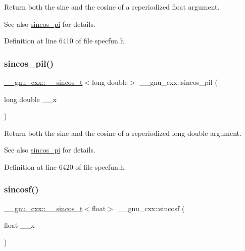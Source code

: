 Return both the sine and the cosine of a reperiodized {\ttfamily float} argument.

\begin{DoxySeeAlso}{See also}
\hyperlink{group__gnu__math__spec__func_ga6553883f127ea0de67041c3128e03813}{sincos\+\_\+pi} for details. 
\end{DoxySeeAlso}


Definition at line 6410 of file specfun.\+h.

\mbox{\label{group__gnu__math__spec__func_ga1f1efc07313a3de1e994d89c3b83b957}} 
\subsubsection{\texorpdfstring{sincos\+\_\+pil()}{sincos\_pil()}}
{\footnotesize\ttfamily \hyperlink{struct____gnu__cxx_1_1____sincos__t}{\+\_\+\+\_\+gnu\+\_\+cxx\+::\+\_\+\+\_\+sincos\+\_\+t}$<$long double$>$ \+\_\+\+\_\+gnu\+\_\+cxx\+::sincos\+\_\+pil (\begin{DoxyParamCaption}\item[{long double}]{\+\_\+\+\_\+x }\end{DoxyParamCaption})\hspace{0.3cm}{\ttfamily [inline]}}

Return both the sine and the cosine of a reperiodized {\ttfamily  long double } argument.

\begin{DoxySeeAlso}{See also}
\hyperlink{group__gnu__math__spec__func_ga6553883f127ea0de67041c3128e03813}{sincos\+\_\+pi} for details. 
\end{DoxySeeAlso}


Definition at line 6420 of file specfun.\+h.

\mbox{\label{group__gnu__math__spec__func_ga3929d13e38535418cd24db5cee80660c}} 
\subsubsection{\texorpdfstring{sincosf()}{sincosf()}}
{\footnotesize\ttfamily \hyperlink{struct____gnu__cxx_1_1____sincos__t}{\+\_\+\+\_\+gnu\+\_\+cxx\+::\+\_\+\+\_\+sincos\+\_\+t}$<$float$>$ \+\_\+\+\_\+gnu\+\_\+cxx\+::sincosf (\begin{DoxyParamCaption}\item[{float}]{\+\_\+\+\_\+x }\end{DoxyParamCaption})\hspace{0.3cm}{\ttfamily [inline]}}

